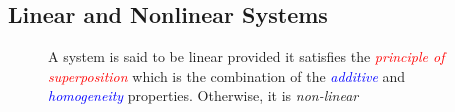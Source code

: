 \documentclass[../notes-main.tex]{subfiles}
\begin{document}
\subsection{Linear and Nonlinear Systems}
\begin{figure}[H]
    \centering
    \begin{mdframed}
        \begin{center}
            A system is said to be linear provided it satisfies the \textcolor{red}{\emph{principle of superposition}} which is the combination of the \textcolor{blue}{\emph{additive}} and \textcolor{blue}{\emph{homogeneity}} properties. Otherwise, it is \emph{non-linear}
        \end{center}
    \end{mdframed}\label{fig:linear-nonlinear-system-def-1}
    \vspace{-1em}
\end{figure}
\end{document}
